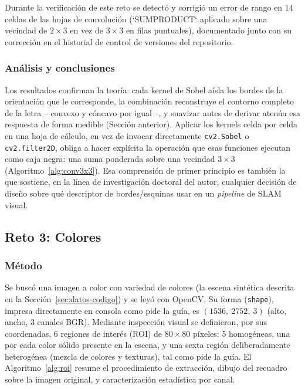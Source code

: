 \documentclass[11pt]{article}
\begin{document}
Durante la verificación de este reto se detectó y corrigió un
error de rango en 14 celdas de las hojas de convolución (`SUMPRODUCT`
aplicado sobre una vecindad de $2\times 3$ en vez de $3\times 3$ en filas
puntuales), documentado junto con su corrección en el historial de control
de versiones del repositorio.

\subsubsection{Análisis y conclusiones}
Los resultados confirman la teoría: cada kernel de Sobel aísla los bordes
de la orientación que le corresponde, la combinación reconstruye el
contorno completo de la letra -- convexo y cóncavo por igual --, y
suavizar antes de derivar atenúa esa respuesta de forma medible
(Sección anterior). Aplicar los kernels celda por
celda en una hoja de cálculo, en vez de invocar directamente
\texttt{cv2.Sobel} o \texttt{cv2.filter2D}, obliga a hacer explícita la
operación que esas funciones ejecutan como caja negra: una suma ponderada
sobre una vecindad $3\times 3$ (Algoritmo~\ref{alg:conv3x3}). Esa
comprensión de primer principio es también la que sostiene, en la línea de
investigación doctoral del autor, cualquier decisión de diseño sobre qué
descriptor de bordes/esquinas usar en un \emph{pipeline} de SLAM visual.

\subsection{Reto 3: Colores}
\label{sec:reto3}

\subsubsection{Método}
Se buscó una imagen a color con variedad de colores (la escena sintética
descrita en la Sección~\ref{sec:datos-codigo}) y se leyó con OpenCV. Su
forma (\texttt{shape}), impresa directamente en consola como pide la guía,
es $(1536,\ 2752,\ 3)$ (alto, ancho, 3 canales BGR). Mediante inspección
visual se definieron, por sus coordenadas, 6 regiones de interés (ROI) de
$80\times 80$ píxeles: 5 homogéneas, una por cada color sólido presente en
la escena, y una sexta región deliberadamente heterogénea (mezcla de
colores y texturas), tal como pide la guía. El Algoritmo~\ref{alg:roi}
resume el procedimiento de extracción, dibujo del recuadro sobre la imagen
original, y caracterización estadística por canal.
\end{document}
